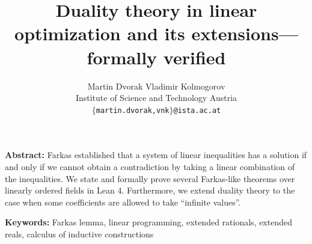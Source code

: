 \documentclass[]{article}
\renewcommand{\.}{\hskip .75pt}
\begin{document}


\title{Duality theory in linear optimization and its extensions\:---\:formally verified}

\author{Martin Dvorak \hspace{30pt} Vladimir Kolmogorov \\
\normalsize Institute of Science and Technology Austria \\ {\normalsize\tt $\{$martin.dvorak,vnk$\}$@ista.ac.at}}
\date{}

\maketitle


\noindent \textbf{Abstract:}\;
Farkas established that a system of linear inequalities has a solution if and only if we cannot obtain
a contradiction by taking a linear combination of the inequalities.
We state and formally prove several Farkas-like theorems over linearly ordered fields in Lean 4.
Furthermore, we extend duality theory to the case when some coefficients are allowed to take
``infinite values''.
\medskip


\noindent \textbf{Keywords:}\;
Farkas lemma, linear programming, extended rationals, extended reals, calculus of inductive constructions
\end{document}
